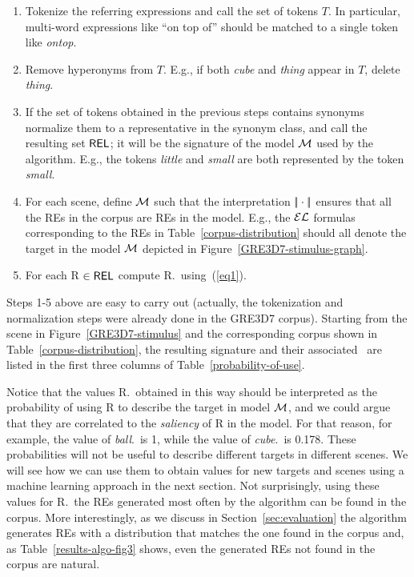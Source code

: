 \vspace*{-.4cm}
\begin{enumerate}
\item Tokenize the referring expressions and call the set of tokens $T$. In particular, multi-word expressions like ``on top of'' 
should be matched to a single token like \emph{ontop}.\\[-1.9em]

\item Remove hyperonyms from $T$. E.g., if both \emph{cube} and \emph{thing} appear in $T$, delete \emph{thing}.\\[-2em]

\item If the set of tokens obtained in the previous steps contains synonyms normalize them to a representative in the synonym class, 
and call the resulting set $\textsf{REL}$; it will be the signature of the model $\mathcal{M}$ used by the algorithm. E.g., the tokens \emph{little} 
and \emph{small} are both represented by the token \emph{small}.\\[-1.9em]

\item For each scene, define $\mathcal{M}$ such that the interpretation $|\!|\cdot|\!|$ ensures that all the REs in the corpus are REs in the model.
 E.g., the $\mathcal{EL}$ formulas corresponding to the REs in Table~\ref{corpus-distribution} should all denote the target in the model $\mathcal{M}$ 
depicted in 
Figure~\ref{GRE3D7-stimulus-graph}.\\[-1.9em]

\item For each R $\in \textsf{REL}$ compute R.\puse\ using~(\ref{eq1}).\\[-1.9em]

\end{enumerate}

Steps 1-5 above are easy to carry out (actually, the tokenization and normalization steps were already done in the GRE3D7 corpus). 
Starting from the scene in Figure~\ref{GRE3D7-stimulus} and the corresponding corpus shown in Table~\ref{corpus-distribution}, 
the resulting signature and their associated \puse\ are listed in the first three columns of Table~\ref{probability-of-use}. 

Notice that the values R.\puse\ obtained in this way should be interpreted as the probability of using R to describe the target in model 
$\mathcal{M}$, and we could argue that they are correlated to the \emph{saliency} of R in the model.  
For that reason, for example, the value of \emph{ball}.\puse\ is 1, while the value of \emph{cube}.\puse\ is 0.178.  
These probabilities will not be useful to describe different targets in different scenes.  We will see how we can use them to obtain
 values for new targets and scenes using a machine learning approach in the next section.  Not surprisingly, using these values for 
R.\puse\ the REs generated most often by the algorithm can be found in the corpus.  More interestingly, as we discuss in 
Section~\ref{sec:evaluation} the algorithm generates REs with a distribution that matches the one found in the corpus and, 
as Table~\ref{results-algo-fig3} shows, even the generated REs not found in the corpus are natural.    



